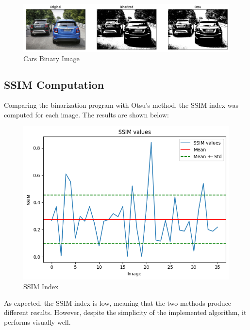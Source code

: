 \begin{multicols}{2}
\begin{figure}[H]
    \centering
    \includegraphics[width=0.98\columnwidth]{../Images/examples/cars_bin.png}
    \caption{Cars Binary Image}
    \label{fig-4}
\end{figure}

\subsection{SSIM Computation}

Comparing the binarization program with Otsu's method, the SSIM index was computed for each image. The results are shown below:

\begin{figure}[H]
    \centering
    \includegraphics[width=0.98\columnwidth]{../Images/examples/SSIM.png}
    \caption{SSIM Index}
    \label{fig-5}
\end{figure}

\noindent
As expected, the SSIM index is low, meaning that the two methods produce different results. However, despite the simplicity of the implemented algorithm, it performs visually well.

\end{multicols}